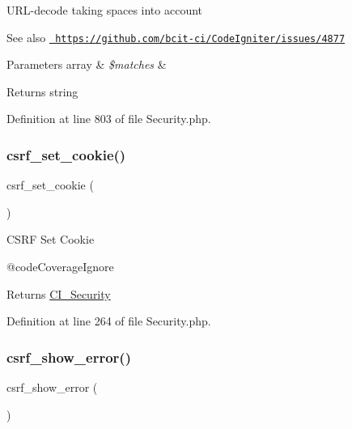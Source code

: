 U\+R\+L-\/decode taking spaces into account

\begin{DoxySeeAlso}{See also}
\href{https://github.com/bcit-ci/CodeIgniter/issues/4877}{\texttt{ https\+://github.\+com/bcit-\/ci/\+Code\+Igniter/issues/4877}} 
\end{DoxySeeAlso}

\begin{DoxyParams}[1]{Parameters}
array & {\em \$matches} & \\
\hline
\end{DoxyParams}
\begin{DoxyReturn}{Returns}
string 
\end{DoxyReturn}


Definition at line 803 of file Security.\+php.

\mbox{\label{class_c_i___security_a55b1380b93b71ab3d9873bb967c2b9bb}} 
\subsubsection{\texorpdfstring{csrf\_set\_cookie()}{csrf\_set\_cookie()}}
{\footnotesize\ttfamily csrf\+\_\+set\+\_\+cookie (\begin{DoxyParamCaption}{ }\end{DoxyParamCaption})}

C\+S\+RF Set Cookie

@code\+Coverage\+Ignore \begin{DoxyReturn}{Returns}
\mbox{\hyperlink{class_c_i___security}{C\+I\+\_\+\+Security}} 
\end{DoxyReturn}


Definition at line 264 of file Security.\+php.

\mbox{\label{class_c_i___security_a3d09c1dc706abfaad987661805c28a06}} 
\subsubsection{\texorpdfstring{csrf\_show\_error()}{csrf\_show\_error()}}
{\footnotesize\ttfamily csrf\+\_\+show\+\_\+error (\begin{DoxyParamCaption}{ }\end{DoxyParamCaption})}

